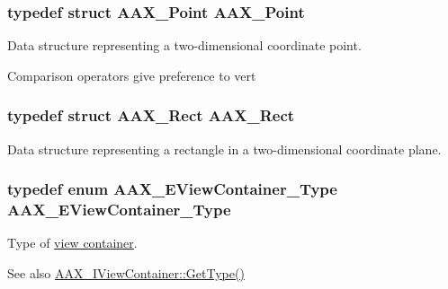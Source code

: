 \subsubsection[{A\+A\+X\+\_\+\+Point}]{\setlength{\rightskip}{0pt plus 5cm}typedef struct {\bf A\+A\+X\+\_\+\+Point}  {\bf A\+A\+X\+\_\+\+Point}}\label{a00214_aace06b5ca898ac66c68fe5f5c598f0b6}


Data structure representing a two-\/dimensional coordinate point. 

Comparison operators give preference to {\ttfamily vert} \hypertarget{a00214_a85ca9d563f37484d29b66a2e4ec6598f}{}
\subsubsection[{A\+A\+X\+\_\+\+Rect}]{\setlength{\rightskip}{0pt plus 5cm}typedef struct {\bf A\+A\+X\+\_\+\+Rect}  {\bf A\+A\+X\+\_\+\+Rect}}\label{a00214_a85ca9d563f37484d29b66a2e4ec6598f}


Data structure representing a rectangle in a two-\/dimensional coordinate plane. 

\hypertarget{a00214_ab4c36de253fc80b541eb51074c64caef}{}
\subsubsection[{A\+A\+X\+\_\+\+E\+View\+Container\+\_\+\+Type}]{\setlength{\rightskip}{0pt plus 5cm}typedef enum {\bf A\+A\+X\+\_\+\+E\+View\+Container\+\_\+\+Type}  {\bf A\+A\+X\+\_\+\+E\+View\+Container\+\_\+\+Type}}\label{a00214_ab4c36de253fc80b541eb51074c64caef}


Type of \hyperlink{a00117}{view container}. 

\begin{DoxySeeAlso}{See also}
\hyperlink{a00117_a1715c042ed8412a2135f4d9e5109e8fb}{A\+A\+X\+\_\+\+I\+View\+Container\+::\+Get\+Type()} 
\end{DoxySeeAlso}


